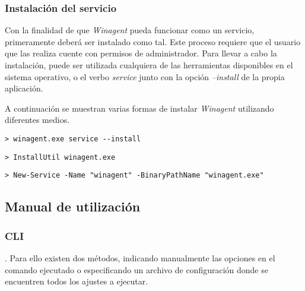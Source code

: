         \subsubsection{Instalación del servicio}
            Con la finalidad de que \textit{Winagent} pueda funcionar como un servicio, primeramente deberá ser instalado como tal. Este proceso requiere  que el usuario que las realiza cuente con permisos de administrador. Para llevar a cabo la instalación, puede ser utilizada cualquiera de las herramientas disponibles en el sistema operativo, o el verbo \textit{service} junto con la opción \textit{--install} de la propia aplicación.
            
            A continuación se muestran varias formas de instalar \textit{Winagent} utilizando diferentes medios.
            
            \begin{lstlisting}[style=batch, caption=Instalación el servicio utilizando el propio agente]
                > winagent.exe service --install
            \end{lstlisting}
            
            \begin{lstlisting}[style=batch, caption=Instalación el servicio utilizando la utilidad \textit{InstallUtil}]
                > InstallUtil winagent.exe
            \end{lstlisting}
            
            \begin{lstlisting}[style=batch, caption=Instalación el servicio utilizando \textit{PowerShell}]
                > New-Service -Name "winagent" -BinaryPathName "winagent.exe"
            \end{lstlisting}
            
     \subsection{Manual de utilización}
        \subsubsection{CLI}
            . Para ello existen dos métodos, indicando manualmente las opciones en el comando ejecutado o especificando un archivo de configuración donde se encuentren todos los ajustes a ejecutar.
            
